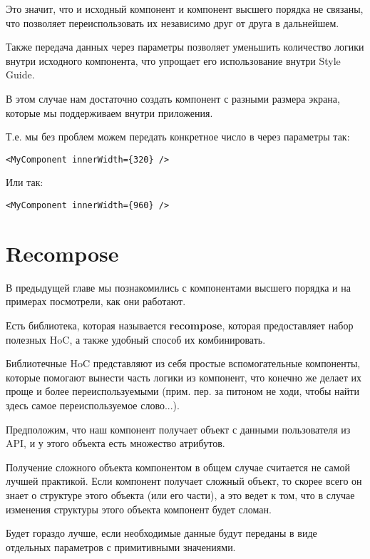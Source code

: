 Это значит, что и исходный компонент и компонент высшего порядка не связаны, что позволяет переиспользовать их независимо друг от друга в дальнейшем.

Также передача данных через параметры позволяет уменьшить количество логики внутри исходного компонента, что упрощает его использование внутри Style Guide. 

В этом случае нам достаточно создать компонент с разными размера экрана, которые мы поддерживаем внутри приложения.

Т.е. мы без проблем можем передать конкретное число в через параметры так:

\begin{lstlisting}
<MyComponent innerWidth={320} />	
\end{lstlisting}

Или так:

\begin{lstlisting}
<MyComponent innerWidth={960} />	
\end{lstlisting}


\section{Recompose}

В предыдущей главе мы познакомились с компонентами высшего порядка и на примерах посмотрели, как они работают.

Есть библиотека, которая называется \textbf{recompose}, которая предоставляет набор полезных HoC, а также удобный способ их комбинировать.

Библиотечные HoC представляют из себя простые вспомогательные компоненты, которые помогают вынести часть логики из компонент, что конечно же делает их проще и более переиспользуемыми (прим. пер. за питоном не ходи, чтобы найти здесь самое переиспользуемое слово...).

Предположим, что наш компонент получает объект с данными пользователя из API, и у этого объекта есть множество атрибутов.

Получение сложного объекта компонентом в общем случае считается не самой лучшей практикой. Если компонент получает сложный объект, то скорее всего он знает о структуре этого объекта (или его части), а это ведет к том, что в случае изменения структуры этого объекта компонент будет сломан.

Будет гораздо лучше, если необходимые данные будут переданы в виде отдельных параметров с примитивными значениями.

